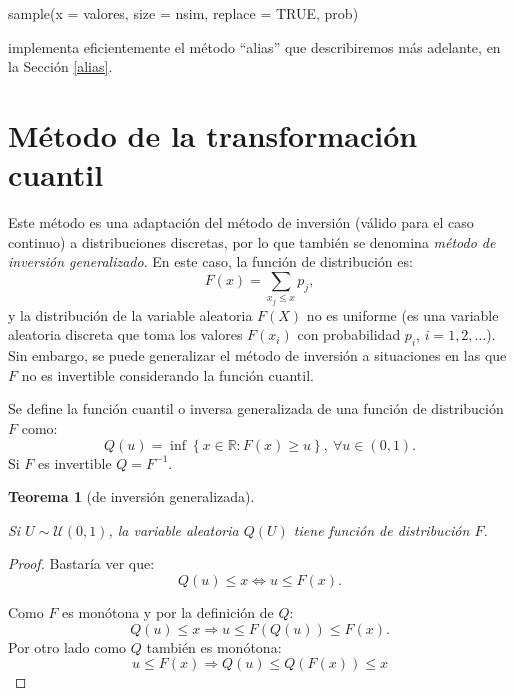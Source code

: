 \documentclass[
]{book}
\newenvironment{Shaded}{\begin{snugshade}}{\end{snugshade}}
\newcommand{\AttributeTok}[1]{\textcolor[rgb]{0.77,0.63,0.00}{#1}}
\newcommand{\ConstantTok}[1]{\textcolor[rgb]{0.00,0.00,0.00}{#1}}
\newcommand{\FunctionTok}[1]{\textcolor[rgb]{0.00,0.00,0.00}{#1}}
\newcommand{\NormalTok}[1]{#1}
\theoremstyle{break}
\newtheorem{theorem}{Teorema}[chapter]
\theoremstyle{nonumberplain}
\newtheorem{proof}{Demostración}
\begin{document}
\begin{Shaded}
\begin{Highlighting}[]
\FunctionTok{sample}\NormalTok{(}\AttributeTok{x =}\NormalTok{ valores, }\AttributeTok{size =}\NormalTok{ nsim, }\AttributeTok{replace =} \ConstantTok{TRUE}\NormalTok{, prob)}
\end{Highlighting}
\end{Shaded}

implementa eficientemente el método ``alias'' que describiremos más adelante, en la Sección \ref{alias}.

\hypertarget{transcuant}{%
\section{Método de la transformación cuantil}\label{transcuant}}

Este método es una adaptación del método de inversión (válido para el caso continuo) a distribuciones discretas, por lo que también se denomina \emph{método de inversión generalizado}.
En este caso, la función de distribución es:
\[F\left( x\right)  =\sum_{x_{j}\leq x}p_{j},\]
y la distribución de la variable aleatoria \(F\left( X\right)\) no es uniforme (es una variable aleatoria discreta que toma los valores \(F\left( x_{i} \right)\) con probabilidad \(p_{i}\), \(i=1,2,\ldots\)).
Sin embargo, se puede generalizar el método de inversión a situaciones en las que \(F\) no es invertible considerando la función cuantil.

Se define la función cuantil o inversa generalizada de una función de distribución \(F\) como:
\[Q\left( u\right) =\inf \left\{ x\in \mathbb{R}:F\left( x\right) \geq
u\right\} ,\ \forall u\in \left( 0,1\right).\]
Si \(F\) es invertible \(Q=F^{-1}\).

\begin{theorem}[de inversión generalizada]
\protect\hypertarget{thm:invgen}{}\label{thm:invgen}

Si \(U\sim \mathcal{U}\left( 0,1\right)\), la variable aleatoria \(Q\left( U\right)\) tiene función de distribución \(F\).
\end{theorem}

\begin{proof}
Bastaría ver que:
\[Q\left( u\right) \leq x \Longleftrightarrow u\leq F(x).\]

Como \(F\) es monótona y por la definición de \(Q\):
\[Q\left( u\right) \leq x \Rightarrow u \leq F(Q\left( u\right)) \leq F(x).\]
Por otro lado como \(Q\) también es monótona:
\[u \leq F(x) \Rightarrow Q\left( u\right) \leq Q(F(x)) \leq x\]
\end{proof}
\end{document}
